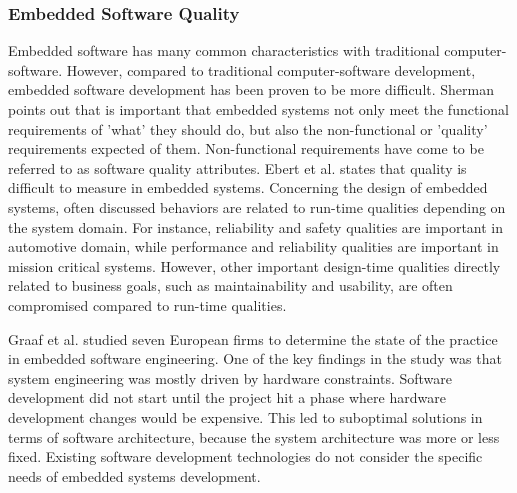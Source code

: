 {\subsubsection{Embedded Software Quality}
Embedded software has many common characteristics with traditional computer-software. However, compared to traditional computer-software development, embedded software development has been proven to be more difficult\cite{ebert2009embedded,sherman2008quality}. Sherman\cite{sherman2008quality} points out that is important that embedded systems not only meet the functional requirements of 'what' they should do, but also the non-functional or 'quality' requirements expected of them. Non-functional requirements have come to be referred to as software quality attributes. Ebert et al.\cite{ebert2009embedded} states that quality is difficult to measure in embedded systems. Concerning the design of embedded systems, often discussed behaviors are related to run-time qualities depending on the system domain. For instance, reliability and safety qualities are important in automotive domain\cite{pretschner2007software}, while performance and reliability qualities are important in mission critical systems\cite{trienekens2010quality}. However, other important design-time qualities directly related to business goals, such as maintainability and usability, are often compromised compared to run-time qualities. 

Graaf et al.\cite{graaf2003embedded} studied seven European firms to determine the state of the practice in embedded software engineering. One of the key findings in the study was that system engineering was mostly driven by hardware constraints. Software development did not start until the project hit a phase where hardware development changes would be expensive. This led to suboptimal solutions in terms of software architecture, because the system architecture was more or less fixed. Existing software development technologies do not consider the specific needs of embedded systems development.









}
